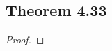 \documentclass[../../main.tex]{subfiles}
\begin{document}
\subsection{Theorem 4.33}
\begin{wts}

\end{wts}
\begin{proof}

\end{proof}
\end{document}
